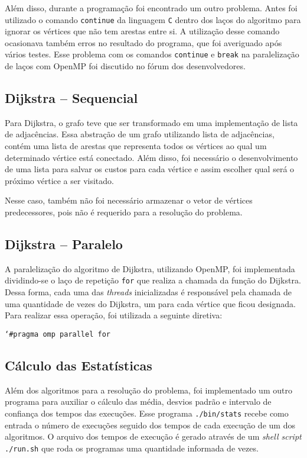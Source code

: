 Além disso, durante a programação foi encontrado um outro problema. Antes foi utilizado o comando \texttt{continue} da linguagem \texttt{C} dentro dos laços do algoritmo para ignorar os vértices que não tem arestas entre si. A utilização desse comando ocasionava também erros no resultado do programa, que foi averiguado após vários testes. Esse problema com os comandos \texttt{continue} e \texttt{break} na paralelização de laços com OpenMP foi discutido no fórum dos desenvolvedores. \cite{continue_break}

\subsection{Dijkstra -- Sequencial}

Para Dijkstra, o grafo teve que ser transformado em uma implementação de lista de adjacências. Essa abstração de um grafo utilizando lista de adjacências, contém uma lista de arestas que representa todos os vértices ao qual um determinado vértice está conectado. Além disso, foi necessário o desenvolvimento de uma lista para salvar os custos para cada vértice e assim escolher qual será o próximo vértice a ser visitado.

Nesse caso, também não foi necessário armazenar o vetor de vértices predecessores, pois não é requerido para a resolução do problema.

\subsection{Dijkstra -- Paralelo}

A paralelização do algoritmo de Dijkstra, utilizando OpenMP, foi implementada dividindo-se o laço de repetição \texttt{for} que realiza a chamada da função do Dijkstra. Dessa forma, cada uma das \textit{threads} inicializadas é responsável pela chamada de uma quantidade de vezes do Dijkstra, um para cada vértice que ficou designada. Para realizar essa operação, foi utilizada a seguinte diretiva:

\texttt{\char`\#pragma omp parallel for}

\subsection{Cálculo das Estatísticas}

Além dos algoritmos para a resolução do problema, foi implementado um outro programa para auxiliar o cálculo das média, desvios padrão e intervalo de confiança dos tempos das execuções. Esse programa \texttt{./bin/stats} recebe como entrada o número de execuções seguido dos tempos de cada execução de um dos algoritmos. O arquivo dos tempos de execução é gerado através de um \emph{shell script} \texttt{./run.sh} que roda os programas uma quantidade informada de vezes.

